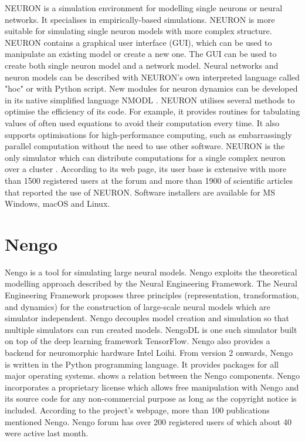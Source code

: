NEURON is a simulation environment for modelling single neurons or neural networks. It specialises in empirically-based simulations. NEURON is more suitable for simulating single neuron models with more complex structure. NEURON contains a graphical user interface (GUI), which can be used to manipulate an existing model or create a new one. The GUI can be used to create both single neuron model and a network model. Neural networks and neuron models can be described with NEURON's own interpreted language called "hoc" or with Python script. New modules for neuron dynamics can be developed in its native simplified language NMODL \cite{tikidji-hamburyanSoftwareBrainNetwork2017}. NEURON utilises several methods to optimise the efficiency of its code. For example, it provides routines for tabulating values of often used equations to avoid their computation every time. It also supports optimisations for high-performance computing, such as embarrassingly parallel computation without the need to use other software. NEURON is the only simulator which can distribute computations for a single complex neuron over a cluster \cite{tikidji-hamburyanSoftwareBrainNetwork2017}. According to its web page, its user base is extensive with more than 1500 registered users at the forum and more than 1900 of scientific articles that reported the use of NEURON. Software installers are available for MS Windows, macOS and Linux.

\section{Nengo}

Nengo is a tool for simulating large neural models. Nengo exploits the theoretical modelling approach described by the Neural Engineering Framework. The Neural Engineering Framework proposes three principles (representation, transformation, and dynamics) for the construction of large-scale neural models which are simulator independent. Nengo decouples model creation and simulation so that multiple simulators can run created models. NengoDL is one such simulator built on top of the deep learning framework TensorFlow. Nengo also provides a backend for neuromorphic hardware Intel Loihi. From version 2 onwards, Nengo is written in the Python programming language. It provides packages for all major operating systems.  shows a relation between the Nengo components. Nengo incorporates a proprietary license which allows free manipulation with Nengo and its source code for any non-commercial purpose as long as the copyright notice is included. According to the project's webpage, more than 100 publications mentioned Nengo. Nengo forum has over 200 registered users of which about 40 were active last month.

